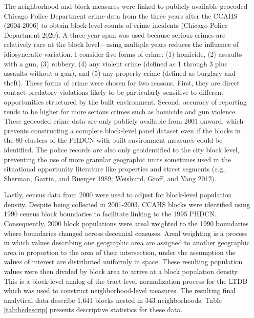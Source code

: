 \documentclass [11pt, proquest] {uwthesis}[2015/03/03]
\begin{document}
The neighborhood and block measures were linked to publicly-available geocoded Chicago Police Department crime data from the three years after the CCAHS (2004-2006) to obtain block-level counts of crime incidents ({Chicago Police Department} 2020). A three-year span was used because serious crimes are relatively rare at the block level---using multiple years reduces the influence of idiosyncratic variation. I consider five forms of crime: (1) homicide, (2) assaults with a gun, (3) robbery, (4) any violent crime (defined as 1 through 3 plus assaults without a gun), and (5) any property crime (defined as burglary and theft). These forms of crime were chosen for two reasons. First, they are direct contact predatory violations likely to be particularly sensitive to different opportunities structured by the built environment. Second, accuracy of reporting tends to be higher for more serious crimes such as homicide and gun violence. These geocoded crime data are only publicly available from 2001 onward, which prevents constructing a complete block-level panel dataset even if the blocks in the 80 clusters of the PHDCN with built environment measures could be identified. The police records are also only geoidentified to the city block level, preventing the use of more granular geographic units sometimes used in the situational opportunity literature like properties and street segments (e.g., Sherman, Gartin, and Buerger 1989; Weisburd, Groff, and Yang 2012).

Lastly, census data from 2000 were used to adjust for block-level population density. Despite being collected in 2001-2003, CCAHS blocks were identified using 1990 census block boundaries to facilitate linking to the 1995 PHDCN. Consequently, 2000 block populations were areal weighted to the 1990 boundaries where boundaries changed across decennial censuses. Areal weighting is a process in which values describing one geographic area are assigned to another geographic area in proportion to the area of their intersection, under the assumption the values of interest are distributed uniformly in space. These resulting population values were then divided by block area to arrive at a block population density. This is a block-level analog of the tract-level normalization process for the LTDB which was used to construct neighborhood-level measures. The resulting final analytical data describe 1,641 blocks nested in 343 neighborhoods. Table \ref{tab:bedescrip} presents descriptive statistics for these data.

\providecommand{\docline}[3]{\noalign{\global\setlength{\arrayrulewidth}{#1}}\arrayrulecolor[HTML]{#2}\cline{#3}}
\end{document}
